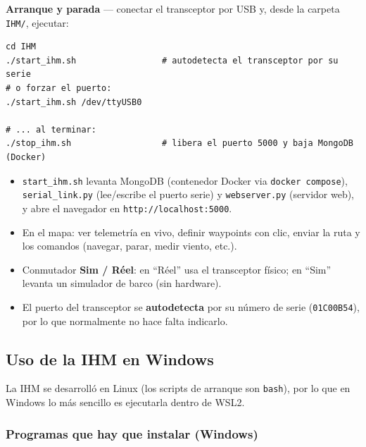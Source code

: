\documentclass[12pt,a4paper]{article}
\newcommand{\file}[1]{\texttt{#1}}
\begin{document}
\textbf{Arranque y parada} --- conectar el transceptor por USB y, desde la carpeta
\file{IHM/}, ejecutar:

\begin{lstlisting}[style=shell, caption={Arrancar y detener la IHM en Linux}]
cd IHM
./start_ihm.sh                 # autodetecta el transceptor por su serie
# o forzar el puerto:
./start_ihm.sh /dev/ttyUSB0

# ... al terminar:
./stop_ihm.sh                  # libera el puerto 5000 y baja MongoDB (Docker)
\end{lstlisting}

\begin{itemize}
  \item \file{start\_ihm.sh} levanta MongoDB (contenedor Docker via
    \texttt{docker compose}), \file{serial\_link.py} (lee/escribe el puerto serie) y
    \file{webserver.py} (servidor web), y abre el navegador en
    \texttt{http://localhost:5000}.
  \item En el mapa: ver telemetr\'ia en vivo, definir waypoints con clic, enviar la
    ruta y los comandos (navegar, parar, medir viento, etc.).
  \item Conmutador \textbf{Sim / R\'eel}: en ``R\'eel'' usa el transceptor f\'isico;
    en ``Sim'' levanta un simulador de barco (sin hardware).
  \item El puerto del transceptor se \textbf{autodetecta} por su n\'umero de serie
    (\texttt{01C00B54}), por lo que normalmente no hace falta indicarlo.
\end{itemize}

\subsection{Uso de la IHM en Windows}

La IHM se desarroll\'o en Linux (los scripts de arranque son \texttt{bash}), por lo
que en Windows lo m\'as sencillo es ejecutarla dentro de WSL2.

\subsubsection{Programas que hay que instalar (Windows)}
\end{document}
